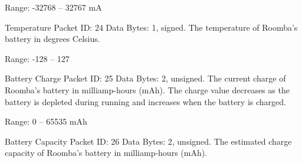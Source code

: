 \begin{Desc}
\begin{description}
Range\+: -\/32768 – 32767 m\+A \item[{\em 
\hypertarget{group__roomba-lib_gga46f008b5055c4a08d3123c6a3478373ea0e59d463778d6b12a2fcb2ac23bbc850}{}R\+O\+O\+M\+B\+A\+\_\+\+T\+E\+M\+P\+E\+R\+A\+T\+U\+R\+E\label{group__roomba-lib_gga46f008b5055c4a08d3123c6a3478373ea0e59d463778d6b12a2fcb2ac23bbc850}
}]Temperature Packet I\+D\+: 24 Data Bytes\+: 1, signed. The temperature of Roomba’s battery in degrees Celsius.

Range\+: -\/128 – 127 \item[{\em 
\hypertarget{group__roomba-lib_gga46f008b5055c4a08d3123c6a3478373ea492387b172d9b626fe66b3d632a38955}{}R\+O\+O\+M\+B\+A\+\_\+\+B\+A\+T\+T\+E\+R\+Y\+\_\+\+C\+H\+A\+R\+G\+E\label{group__roomba-lib_gga46f008b5055c4a08d3123c6a3478373ea492387b172d9b626fe66b3d632a38955}
}]Battery Charge Packet I\+D\+: 25 Data Bytes\+: 2, unsigned. The current charge of Roomba’s battery in milliamp-\/hours (m\+Ah). The charge value decreases as the battery is depleted during running and increases when the battery is charged.

Range\+: 0 – 65535 m\+Ah \item[{\em 
\hypertarget{group__roomba-lib_gga46f008b5055c4a08d3123c6a3478373eaa53df1ccfa1de33d1754272fa9edd804}{}R\+O\+O\+M\+B\+A\+\_\+\+B\+A\+T\+T\+E\+R\+Y\+\_\+\+C\+A\+P\+A\+C\+I\+T\+Y\label{group__roomba-lib_gga46f008b5055c4a08d3123c6a3478373eaa53df1ccfa1de33d1754272fa9edd804}
}]Battery Capacity Packet I\+D\+: 26 Data Bytes\+: 2, unsigned. The estimated charge capacity of Roomba’s battery in milliamp-\/hours (m\+Ah).


\end{description}
\end{Desc}

